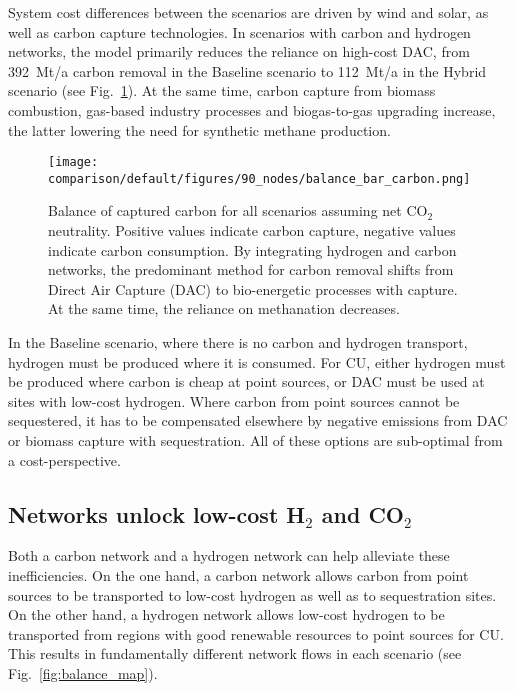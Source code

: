 \documentclass[twocolumn]{article}
\newcommand{\carbon}{CO$_2$}
\newcommand{\hydrogen}{H$_2$}
\newcommand{\baselinescenario}{Baseline scenario}
\newcommand{\hybridscenario}{Hybrid scenario}
\begin{document}
System cost differences between the scenarios are driven by wind and solar, as well as carbon capture technologies. In scenarios with carbon and hydrogen networks, the model primarily reduces the reliance on high-cost DAC, from 392~Mt/a carbon removal in the \baselinescenario{} to 112~Mt/a in the \hybridscenario{} (see Fig.~\ref{fig:balance_captured_carbon}). At the same time, carbon capture from biomass combustion, gas-based industry processes and biogas-to-gas upgrading increase, the latter lowering the need for synthetic methane production.

\begin{figure}[ht!]
    \centering
    \texttt{[image: comparison/default/figures/90\_nodes/balance\_bar\_carbon.png]}
    \caption{Balance of captured carbon for all scenarios assuming net \carbon{} neutrality. Positive values indicate carbon capture, negative values indicate carbon consumption. By integrating hydrogen and carbon networks, the predominant method for carbon removal shifts from Direct Air Capture (DAC) to bio-energetic processes with capture. At the same time, the reliance on methanation decreases.}
    \label{fig:balance_captured_carbon}
\end{figure}

In the \baselinescenario{}, where there is no carbon and hydrogen transport, hydrogen must be produced where it is consumed. For CU, either hydrogen must be produced where carbon is cheap at point sources, or DAC must be used at sites with low-cost hydrogen. Where carbon from point sources cannot be sequestered, it has to be compensated elsewhere by negative emissions from DAC or biomass capture with sequestration. All of these options are sub-optimal from a cost-perspective.

\subsection*{Networks unlock low-cost \hydrogen{} and \carbon{}}

Both a carbon network and a hydrogen network can help alleviate these inefficiencies. On the one hand, a carbon network allows carbon from point sources to be transported to low-cost hydrogen as well as to sequestration sites. On the other hand, a hydrogen network allows low-cost hydrogen to be transported from regions with good renewable resources to point sources for CU. This results in fundamentally different network flows in each scenario (see Fig.~\ref{fig:balance_map}).
\end{document}
